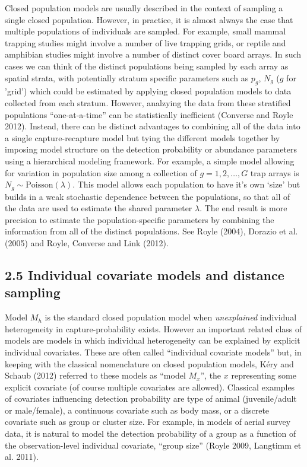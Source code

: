 \documentclass{book}
\begin{document}
Closed population models are usually described in the context of
sampling a single closed population. However, in practice, it is
almost always the case that multiple populations of individuals are
sampled. For example, small mammal trapping studies might involve a
number of live trapping grids, or reptile and amphibian studies might
involve a number of distinct cover board arrays.  In such cases we can
think of the distinct populations being sampled by each array as spatial strata,
with potentially stratum specific parameters such as $p_{g}$, $N_{g}$
($g$ for 'grid') which could be estimated by applying closed
population models to data collected from each stratum.  However,
analzying the data from these stratified populations ``one-at-a-time''
can be statistically inefficient (Converse and Royle 2012). Instead,
there can be distinct advantages to combining all of the data into a
single capture-recapture model but tying the different models together
by imposing model structure on the detection probability or abundance
parameters using a hierarchical modeling framework.  For example, a
simple model allowing for variation in population size among a
collection of $g=1,2,\ldots,G$ trap arrays is $N_{g} \sim
\mbox{Poisson}(\lambda)$. This model allows each population to have
it's own `size' but builds in a weak stochastic dependence between the
populations, so that all of the data are used to estimate the shared
parameter $\lambda$. The end result is more precision to estimate the
population-specific parameters by combining the information from all
of the distinct populations. See Royle (2004), Dorazio et al. (2005)
and Royle, Converse and Link (2012).


\subsection*{2.5 Individual covariate models and distance sampling}

Model $M_h$ is the standard closed population model when {\it
  unexplained} individual heterogeneity in capture-probability
exists. However an important related class of models are models in
which individual heterogeneity can be explained by explicit individual
covariates. These are often called ``individual covariate models''
but, in keeping with the classical nomenclature on closed population
models, K\'{e}ry and Schaub (2012) referred to these models as ``model
$M_{x}$'', the $x$ representing some explicit covariate (of course
multiple covariates are allowed).  Classical examples of covariates
influencing detection probability are type of animal (juvenile/adult
or male/female), a continuous covariate such as body mass, or a
discrete covariate such as group or cluster size. For example, in
models of aerial survey data, it is natural to model the detection
probability of a group as a function of the observation-level
individual covariate, ``group size'' (Royle 2009, Langtimm et
al. 2011).
\end{document}
